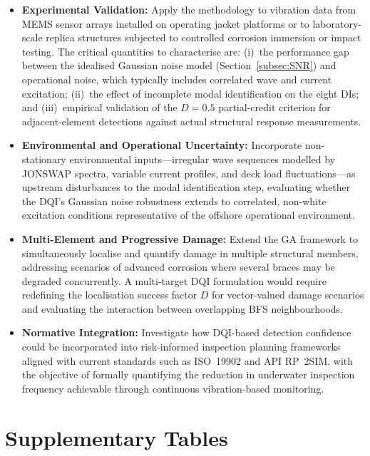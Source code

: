 \documentclass[a4paper,fleqn,nologo]{cas-dc}
\begin{document}
\begin{itemize}
    \item \textbf{Experimental Validation:} Apply the methodology to vibration data from MEMS sensor arrays installed on operating jacket platforms \citep{ghsoub2018structural} or to laboratory-scale replica structures subjected to controlled corrosion immersion or impact testing. The critical quantities to characterise are: (i)~the performance gap between the idealised Gaussian noise model (Section~\ref{subsec:SNR}) and operational noise, which typically includes correlated wave and current excitation; (ii)~the effect of incomplete modal identification on the eight DIs; and (iii)~empirical validation of the $D=0.5$ partial-credit criterion for adjacent-element detections against actual structural response measurements.
    \item \textbf{Environmental and Operational Uncertainty:} Incorporate non-stationary environmental inputs---irregular wave sequences modelled by JONSWAP spectra, variable current profiles, and deck load fluctuations---as upstream disturbances to the modal identification step, evaluating whether the DQI's Gaussian noise robustness extends to correlated, non-white excitation conditions representative of the offshore operational environment.
    \item \textbf{Multi-Element and Progressive Damage:} Extend the GA framework to simultaneously localise and quantify damage in multiple structural members, addressing scenarios of advanced corrosion where several braces may be degraded concurrently. A multi-target DQI formulation would require redefining the localisation success factor $D$ for vector-valued damage scenarios and evaluating the interaction between overlapping BFS neighbourhoods.
    \item \textbf{Normative Integration:} Investigate how DQI-based detection confidence could be incorporated into risk-informed inspection planning frameworks aligned with current standards such as ISO~19902 and API RP~2SIM, with the objective of formally quantifying the reduction in underwater inspection frequency achievable through continuous vibration-based monitoring.
\end{itemize}

\appendix
\section{Supplementary Tables}
\label{sec:apendice}

\onecolumn

\twocolumn



\end{document}

